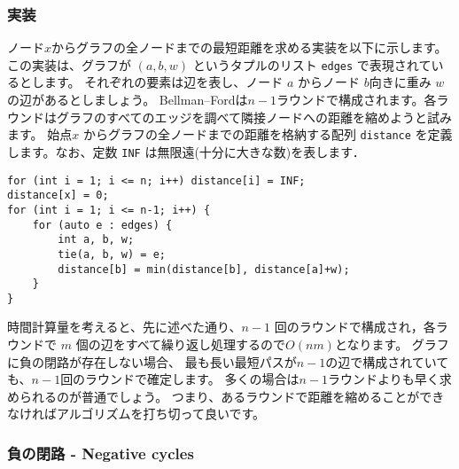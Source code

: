 \subsubsection{実装}

ノード$x$からグラフの全ノードまでの最短距離を求める実装を以下に示します。
この実装は、グラフが $(a, b, w)$ というタプルのリスト \texttt{edges} で表現されているとします。
それぞれの要素は辺を表し、ノード $a$ からノード $b$向きに重み $w$ の辺があるとしましょう。
Bellman–Fordは$n - 1$ラウンドで構成されます。各ラウンドはグラフのすべてのエッジを調べて隣接ノードへの距離を縮めようと試みます。
始点$x$ からグラフの全ノードまでの距離を格納する配列 \texttt{distance} を定義します。なお、定数 \texttt{INF} は無限遠(十分に大きな数)を表します．

\begin{lstlisting}
for (int i = 1; i <= n; i++) distance[i] = INF;
distance[x] = 0;
for (int i = 1; i <= n-1; i++) {
    for (auto e : edges) {
        int a, b, w;
        tie(a, b, w) = e;
        distance[b] = min(distance[b], distance[a]+w);
    }
}
\end{lstlisting}

時間計算量を考えると、先に述べた通り、$n - 1$ 回のラウンドで構成され，各ラウンドで $m$ 個の辺をすべて繰り返し処理するので$O(nm)$となります。
グラフに負の閉路が存在しない場合、
最も長い最短パスが$n - 1$の辺で構成されていても、$n - 1$回のラウンドで確定します。
多くの場合は$n - 1$ラウンドよりも早く求められるのが普通でしょう。
つまり、あるラウンドで距離を縮めることができなければアルゴリズムを打ち切って良いです。

\subsubsection{負の閉路 - Negative cycles}


